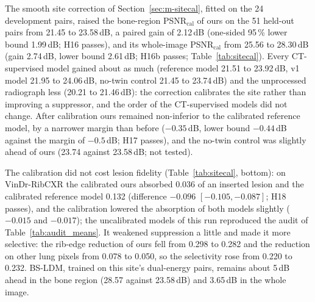 The smooth site correction of Section~\ref{sec:m-sitecal}, fitted on the 24 development pairs, raised the bone-region PSNR$_{\mathrm{cal}}$
of ours on the 51 held-out pairs from 21.45 to 23.58\,dB, a paired gain of 2.12\,dB (one-sided 95\,\% lower bound 1.99\,dB; H16 passes),
and its whole-image PSNR$_{\mathrm{cal}}$ from 25.56 to 28.30\,dB (gain 2.74\,dB, lower bound 2.61\,dB; H16b passes;
Table~\ref{tab:sitecal}). Every CT-supervised model gained about as much (reference model 21.51 to 23.92\,dB, v1 model 21.95 to 24.06\,dB,
no-twin control 21.45 to 23.74\,dB) and the unprocessed radiograph less (20.21 to 21.46\,dB): the correction calibrates the site rather
than improving a suppressor, and the order of the CT-supervised models did not change. After calibration ours remained non-inferior to the
calibrated reference model, by a narrower margin than before ($-0.35$\,dB, lower bound $-0.44$\,dB against the margin of $-0.5$\,dB; H17
passes), and the no-twin control was slightly ahead of ours (23.74 against 23.58\,dB; not tested).

The calibration did not cost lesion fidelity (Table~\ref{tab:sitecal}, bottom): on VinDr-RibCXR the calibrated ours absorbed 0.036 of an
inserted lesion and the calibrated reference model 0.132 (difference $-0.096$ $[-0.105,-0.087]$; H18 passes), and the calibration lowered
the absorption of both models slightly ($-0.015$ and $-0.017$); the uncalibrated models of this run reproduced the audit of
Table~\ref{tab:audit_means}. It weakened suppression a little and made it more selective: the rib-edge reduction of ours fell from 0.298 to
0.282 and the reduction on other lung pixels from 0.078 to 0.050, so the selectivity rose from 0.220 to 0.232. BS-LDM, trained on this
site's dual-energy pairs, remains about 5\,dB ahead in the bone region (28.57 against 23.58\,dB) and 3.65\,dB in the whole image.

